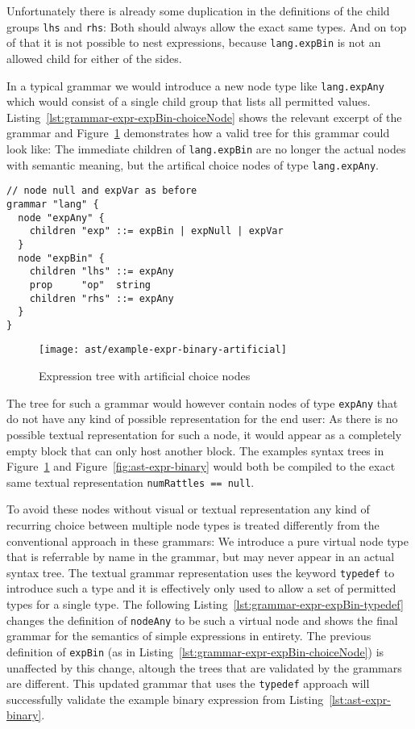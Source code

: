 \documentclass[sigconf,natbib=false]{acmart}
\newcommand\astScale{0.7}
\begin{document}
Unfortunately there is already some duplication in the definitions of the child groups \texttt{lhs} and \texttt{rhs}: Both should always allow the exact same types. And on top of that it is not possible to nest expressions, because \texttt{lang.expBin} is not an allowed child for either of the sides.

In a typical grammar we would introduce a new node type like \texttt{lang.expAny} which would consist of a single child group that lists all permitted values. Listing~\ref{lst:grammar-expr-expBin-choiceNode} shows the relevant excerpt of the grammar and Figure~\ref{fig:ast-choice-node} demonstrates how a valid tree for this grammar could look like: The immediate children of \texttt{lang.expBin} are no longer the actual nodes with semantic meaning, but the artifical choice nodes of type \texttt{lang.expAny}.


\begin{lstlisting}[caption={Grammar for expression \texttt{expBin} with choice node}, label=lst:grammar-expr-expBin-choiceNode]
// node null and expVar as before
grammar "lang" {
  node "expAny" {
    children "exp" ::= expBin | expNull | expVar
  }
  node "expBin" {
    children "lhs" ::= expAny
    prop     "op"  string
    children "rhs" ::= expAny
  }
}
\end{lstlisting}

\begin{figure}
  \texttt{[image: ast/example-expr-binary-artificial]}
  \caption{Expression tree with artificial choice nodes}
  \label{fig:ast-choice-node}
\end{figure}

The tree for such a grammar would however contain nodes of type \texttt{expAny} that do not have any kind of possible representation for the end user: As there is no possible textual representation for such a node, it would appear as a completely empty block that can only host another block. The examples syntax trees in Figure~\ref{fig:ast-choice-node} and Figure~\ref{fig:ast-expr-binary} would both be compiled to the exact same textual representation \texttt{numRattles == null}.

To avoid these nodes without visual or textual representation any kind of recurring choice between multiple node types is treated differently from the conventional approach in these grammars: We introduce a pure virtual node type that is referrable by name in the grammar, but may never appear in an actual syntax tree. The textual grammar representation uses the keyword \texttt{typedef} to introduce such a type and it is effectively only used to allow a set of permitted types for a single type. The following Listing~\ref{lst:grammar-expr-expBin-typedef} changes the definition of \texttt{nodeAny} to be such a virtual node and shows the final grammar for the semantics of simple expressions in entirety. The previous definition of \texttt{expBin} (as in Listing~\ref{lst:grammar-expr-expBin-choiceNode}) is unaffected by this change, altough the trees that are validated by the grammars are different. This updated grammar that uses the \texttt{typedef} approach will successfully validate the example binary expression from Listing~\ref{lst:ast-expr-binary}.
\end{document}

